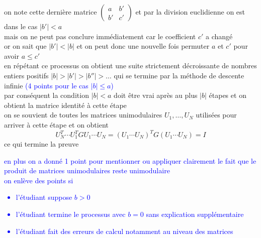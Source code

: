 \documentclass[11pt, a4paper, oneside]{article}
\begin{document}
on note cette dernière matrice $\begin{pmatrix} a & b' \\ b' & c' \end{pmatrix}$ {\tiny et par la division euclidienne} on est dans le cas $|b'|<a$ \\
{\tiny mais on ne peut pas conclure immédiatement car le coefficient $c'$ a changé} \\
or on sait que $|b'|<|b|$ et on peut donc une nouvelle fois permuter $a$ et $c'$ pour avoir $a\leq c'$ \\
en répétant ce processus on obtient une suite strictement décroissante de nombres entiers positifs $|b|>|b'|>|b''|> \ldots$ qui se termine {\tiny par la méthode de descente infinie} \textcolor{blue}{(4 points pour le cas $|b|\leq a$)} \\
par conséquent la condition $|b|<a$ doit être vrai {\tiny après au plus $|b|$ étapes} et on obtient la matrice identité à cette étape \\
on se souvient de toutes les matrices unimodulaires $U_1,\ldots,U_N$ utilisées pour arriver à cette étape et on obtient
$$U_N^T\cdots U_1^TGU_1 \cdots U_N = \left(U_1\cdots U_N\right)^TG\left(U_1\cdots U_N\right) = I$$
{\tiny ce qui termine la preuve} \\
\textcolor{blue}{en plus on a donné 1 point pour mentionner ou appliquer clairement le fait que le produit de matrices unimodulaires reste unimodulaire \\
on enlève des points si \begin{itemize} 
\item l'étudiant suppose $b>0$
\item l'étudiant termine le processus avec $b=0$ sans explication supplémentaire
\item l'étudiant fait des erreurs de calcul notamment au niveau des matrices
\end{itemize}}
\end{document}
